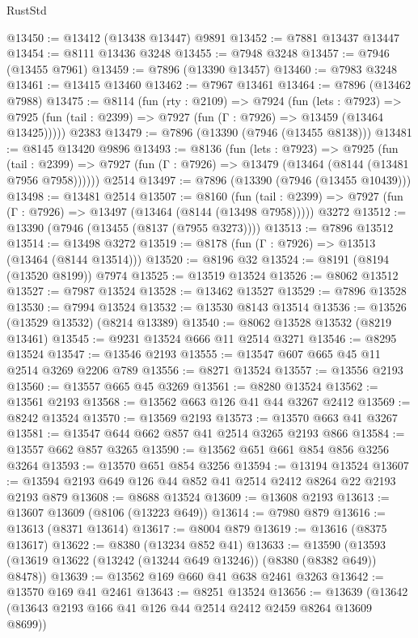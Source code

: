 \begin{lexlean}{RustStd}
\begin{coremodule}
{\begin{coremodule}
{{{{{{{{{{{{{{{{{{{{{{{{{{{{{{{{{{{{{{{{{{{{{{{{{{@13450 := @13412 (@13438 @13447) @9891
@13452 := @7881 @13437 @13447
@13454 := @8111 @13436 @3248
@13455 := @7948 @3248
@13457 := @7946 (@13455 @7961)
@13459 := @7896 (@13390 @13457)
@13460 := @7983 @3248
@13461 := @13415 @13460
@13462 := @7967 @13461
@13464 := @7896 (@13462 @7988)
@13475 := @8114
    (fun (rty : @2109) =>
    @7924
      (fun (lets : @7923) =>
      @7925 (fun (tail : @2399) => @7927 (fun (Γ : @7926) => @13459 (@13464 @13425)))))
    @2383
@13479 := @7896 (@13390 (@7946 (@13455 @8138)))
@13481 := @8145 @13420 @9896
@13493 := @8136
    (fun (lets : @7923) =>
    @7925
      (fun (tail : @2399) =>
      @7927 (fun (Γ : @7926) => @13479 (@13464 (@8144 (@13481 @7956 @7958))))))
    @2514
@13497 := @7896 (@13390 (@7946 (@13455 @10439)))
@13498 := @13481 @2514
@13507 := @8160
    (fun (tail : @2399) => @7927 (fun (Γ : @7926) => @13497 (@13464 (@8144 (@13498 @7958)))))
    @3272
@13512 := @13390 (@7946 (@13455 (@8137 (@7955 @3273))))
@13513 := @7896 @13512
@13514 := @13498 @3272
@13519 := @8178 (fun (Γ : @7926) => @13513 (@13464 (@8144 @13514)))
@13520 := @8196 @32
@13524 := @8191 (@8194 (@13520 @8199)) @7974
@13525 := @13519 @13524
@13526 := @8062 @13512
@13527 := @7987 @13524
@13528 := @13462 @13527
@13529 := @7896 @13528
@13530 := @7994 @13524
@13532 := @13530 @8143 @13514
@13536 := @13526 (@13529 @13532) (@8214 @13389)
@13540 := @8062 @13528 @13532 (@8219 @13461)
@13545 := @9231 @13524 @666 @11 @2514 @3271
@13546 := @8295 @13524
@13547 := @13546 @2193
@13555 := @13547 @607 @665 @45 @11 @2514 @3269 @2206 @789
@13556 := @8271 @13524
@13557 := @13556 @2193
@13560 := @13557 @665 @45 @3269
@13561 := @8280 @13524
@13562 := @13561 @2193
@13568 := @13562 @663 @126 @41 @44 @3267 @2412
@13569 := @8242 @13524
@13570 := @13569 @2193
@13573 := @13570 @663 @41 @3267
@13581 := @13547 @644 @662 @857 @41 @2514 @3265 @2193 @866
@13584 := @13557 @662 @857 @3265
@13590 := @13562 @651 @661 @854 @856 @3256 @3264
@13593 := @13570 @651 @854 @3256
@13594 := @13194 @13524
@13607 := @13594 @2193 @649 @126 @44 @852 @41 @2514 @2412 @8264 @22 @2193 @2193 @879
@13608 := @8688 @13524
@13609 := @13608 @2193
@13613 := @13607 @13609 (@8106 (@13223 @649))
@13614 := @7980 @879
@13616 := @13613 (@8371 @13614)
@13617 := @8004 @879
@13619 := @13616 (@8375 @13617)
@13622 := @8380 (@13234 @852 @41)
@13633 := @13590 (@13593 (@13619 @13622 (@13242 (@13244 @649 @13246)) (@8380 (@8382 @649)) @8478))
@13639 := @13562 @169 @660 @41 @638 @2461 @3263
@13642 := @13570 @169 @41 @2461
@13643 := @8251 @13524
@13656 := @13639 (@13642 (@13643 @2193 @166 @41 @126 @44 @2514 @2412 @2459 @8264 @13609 @8699))
}}}}}}}}}}}}}}}}}}}}}}}}}}}}}}}}}}}}}}}}}}}}}}}}}}
\end{coremodule}}
\end{coremodule}
\end{lexlean}
